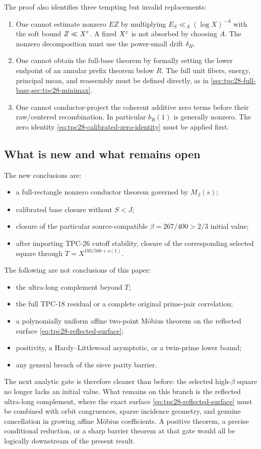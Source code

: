 The proof also identifies three tempting but invalid replacements:
\begin{enumerate}[label=\textup{(\arabic*)}]
 \item One cannot estimate nonzero $EZ$ by multiplying
 $E_S\ll_A(\log X)^{-A}$ with the soft bound $Z\ll X^\varepsilon$.
 A fixed $X^\varepsilon$ is not absorbed by choosing $A$.  The nonzero
 decomposition must use the power-small drift $\delta_H$.
 \item One cannot obtain the full-base theorem by formally setting the
 lower endpoint of an annular prefix theorem below $R$.  The full
 unit fibers, energy, principal mean, and reassembly must be defined
 directly, as in \cref{sec:tpc28-full-base,sec:tpc28-minimax}.
 \item One cannot conductor-project the coherent additive zero terms
 before their raw/centered recombination.  In particular $b_R(1)$ is
 generally nonzero.  The zero identity
 \eqref{eq:tpc28-calibrated-zero-identity} must be applied first.
\end{enumerate}

\subsection{What is new and what remains open}

The new conclusions are:
\begin{itemize}
 \item a full-rectangle nonzero conductor theorem governed by
 $M_\beta(s)$;
 \item calibrated base closure without $S<J$;
 \item closure of the particular source-compatible
 $\beta=267/400>2/3$ initial value;
 \item after importing TPC-26 cutoff stability, closure of the
 corresponding selected square through $T=X^{193/500+o(1)}$.
\end{itemize}

The following are not conclusions of this paper:
\begin{itemize}
 \item the ultra-long complement beyond $T$;
 \item the full TPC-18 residual or a complete original prime-pair
 correlation;
 \item a polynomially uniform affine two-point M\"obius theorem on the
 reflected surface \eqref{eq:tpc28-reflected-surface};
 \item positivity, a Hardy--Littlewood asymptotic, or a twin-prime
 lower bound;
 \item any general breach of the sieve parity barrier.
\end{itemize}

The next analytic gate is therefore cleaner than before: the selected
high-$\beta$ square no longer lacks an initial value.  What remains on
this branch is the reflected ultra-long complement, where the exact
surface \eqref{eq:tpc28-reflected-surface} must be combined with orbit
congruences, sparse incidence geometry, and genuine cancellation in
growing affine M\"obius coefficients.  A positive theorem, a precise
conditional reduction, or a sharp barrier theorem at that gate would
all be logically downstream of the present result.
